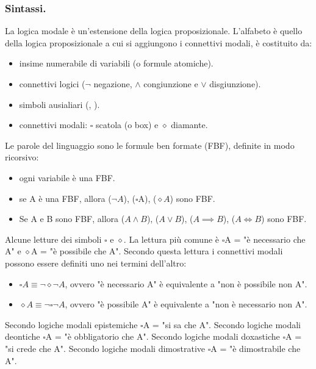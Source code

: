 \documentclass{article}
\theoremstyle{definition}
\theoremstyle{plain}
\theoremstyle{plain}
\theoremstyle{plain}
\theoremstyle{plain}
\begin{document}
\subsubsection*{Sintassi.}
La logica modale è un'estensione della logica proposizionale. L'alfabeto è quello della logica proposizionale a cui si aggiungono i connettivi modali, è costituito da:
\begin{itemize}
    \item insime numerabile di variabili (o formule atomiche).
    \item connettivi logici ($\neg$ negazione, $\land$ congiunzione e $\lor$ disgiunzione).
    \item simboli ausialiari (, ).
    \item connettivi modali: $\square$ scatola (o box) e $\diamond$ diamante.
\end{itemize}
Le parole del linguaggio sono le formule ben formate (FBF), definite in modo ricorsivo:
\begin{itemize}
    \item ogni variabile è una FBF.
    \item se A è una FBF, allora ($\neg A$), ($\square$A), ($\diamond A$) sono FBF.
    \item Se A e B sono FBF, allora ($A \land B$), ($A \lor B$), ($A \implies B$), ($A \iff B$) sono FBF.
\end{itemize}

Alcune letture dei simboli $\square$ e $\diamond$. \newline
La lettura più comune è $\square$A = "è necessario che A" e $\diamond$A = "è possibile che A". \newline
Secondo questa lettura i connettivi modali possono essere definiti uno nei termini dell'altro: 
\begin{itemize}
    \item $\square A \equiv \neg \diamond \neg A$, ovvero "è necessario A" è equivalente a "non è possibile non A". 
    \item $\diamond A \equiv \neg \square \neg A$, ovvero "è possibile A" è equivalente a "non è necessario non A".
\end{itemize}
Secondo logiche modali epistemiche $\square$A = "si sa che A". \newline
Secondo logiche modali deontiche $\square$A = "è obbligatorio che A". \newline
Secondo logiche modali doxastiche $\square$A = "si crede che A". \newline
Secondo logiche modali dimostrative $\square$A = "è dimostrabile che A".
\end{document}
